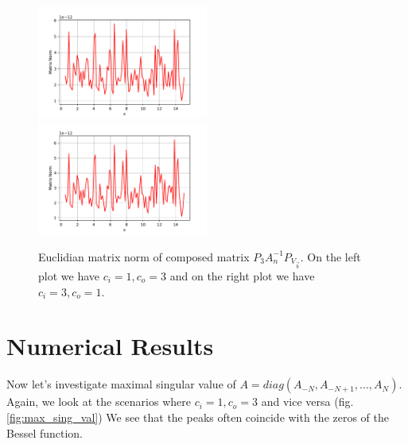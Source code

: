 \documentclass[10pt,journal,compsoc, onecolumn]{IEEEtran}
\begin{document}
\begin{figure}
    \includegraphics[width=0.5\textwidth]{scenario1PVal.pdf}
    \includegraphics[width=0.5\textwidth]{scenario2PVal.pdf}
    \caption{Euclidian matrix norm of composed matrix  $P_3A_n^{-1}P_{V_{\vec{b}}}$. 
    On the left plot we have $c_i = 1, c_o = 3$ 
    and on the right plot we have $c_i = 3, c_o = 1.$}
   \label{fig:p_validation}
\end{figure}


\section{Numerical Results}
Now let's investigate maximal singular value of $A = diag(A_{-N}, A_{-N + 1}, ..., A_{N})$. 
Again, we look at the scenarios where $c_i = 1, c_o = 3$ and vice versa (fig. \ref{fig:max_sing_val})
We see that the peaks often coincide with the zeros of the Bessel function. 
\end{document}
